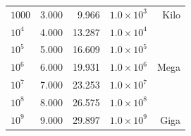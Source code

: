\documentclass[12pt]{article}
\begin{document}
\begin{table}[h]
\begin{tabular}{|l|r|r|r|r|}
        \(1000\)      & 3.000   & 9.966   & \(1.0 \times 10^{3}\) & Kilo \\
        \(10^4\)      & 4.000   & 13.287  & \(1.0 \times 10^{4}\) & \\
        \(10^5\)      & 5.000   & 16.609  & \(1.0 \times 10^{5}\) & \\
        \(10^6\)      & 6.000   & 19.931  & \(1.0 \times 10^{6}\) & Mega \\
        \(10^7\)      & 7.000   & 23.253  & \(1.0 \times 10^{7}\) & \\
        \(10^8\)      & 8.000   & 26.575  & \(1.0 \times 10^{8}\) & \\
        \(10^9\)      & 9.000   & 29.897  & \(1.0 \times 10^{9}\) & Giga \\
        \hline
    \end{tabular}
\end{table}
\end{document}
